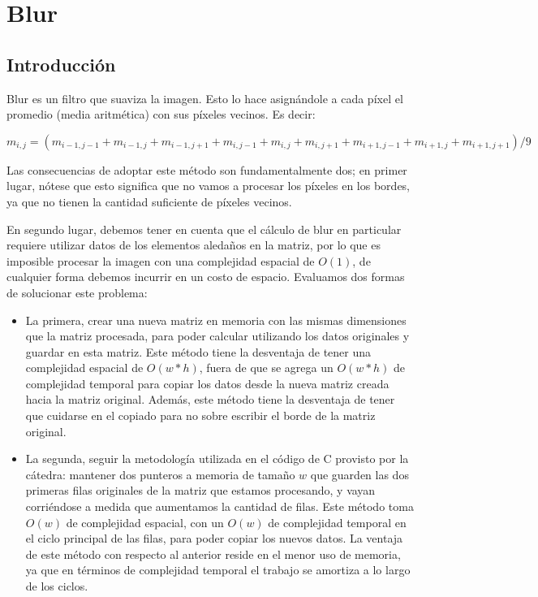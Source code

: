 \section{Blur}

\subsection{Introducción}
Blur es un filtro que suaviza la imagen. Esto lo hace asignándole a cada píxel el promedio (media aritmética) con sus píxeles vecinos. Es decir:

$$m_{i, j} = (m_{i-1, j-1} + m_{i-1, j} + m_{i-1, j+1} + m_{i, j-1} + m_{i, j} + m_{i, j+1} + m_{i+1, j-1} + m_{i+1, j} + m_{i+1, j+1}) / 9$$

Las consecuencias de adoptar este método son fundamentalmente dos; en primer lugar, nótese que esto significa que no vamos a procesar los píxeles en los bordes, ya que no tienen la cantidad suficiente de píxeles vecinos.

En segundo lugar, debemos tener en cuenta que el cálculo de blur en particular requiere utilizar datos de los elementos aledaños en la matriz, por lo que es imposible procesar la imagen con una complejidad espacial de $O(1)$, de cualquier forma debemos incurrir en un costo de espacio. Evaluamos dos formas de solucionar este problema:

\begin{itemize}
\item La primera, crear una nueva matriz en memoria con las mismas dimensiones que la matriz procesada, para poder calcular utilizando los datos originales y guardar en esta matriz. Este método tiene la desventaja de tener una complejidad espacial de $O(w*h)$, fuera de que se agrega un $O(w*h)$ de complejidad temporal para copiar los datos desde la nueva matriz creada hacia la matriz original. Además, este método tiene la desventaja de tener que cuidarse en el copiado para no sobre escribir el borde de la matriz original.

\item La segunda, seguir la metodología utilizada en el código de C provisto por la cátedra: mantener dos punteros a memoria de tamaño $w$ que guarden las dos primeras filas originales de la matriz que estamos procesando, y vayan corriéndose a medida que aumentamos la cantidad de filas. Este método toma $O(w)$ de complejidad espacial, con un $O(w)$ de complejidad temporal en el ciclo principal de las filas, para poder copiar los nuevos datos. La ventaja de este método con respecto al anterior reside en el menor uso de memoria, ya que en términos de complejidad temporal el trabajo se amortiza a lo largo de los ciclos.
\end{itemize}

